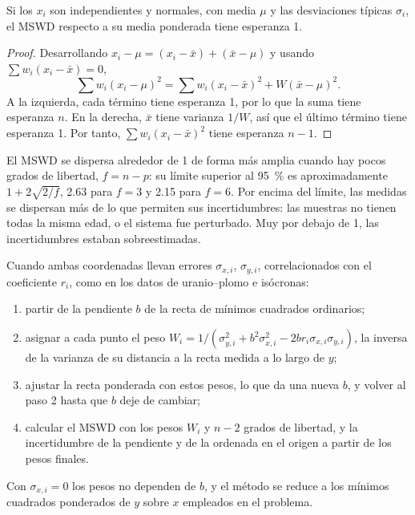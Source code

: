 \begin{proposition}\label{prop:b3:advanced-geochronology:mswd}
Si los $x_i$ son independientes y normales, con media $\mu$ y las desviaciones
típicas $\sigma_i$, el MSWD respecto a su media ponderada tiene esperanza 1.
\end{proposition}

\begin{proof}
Desarrollando $x_i - \mu = (x_i - \bar x) + (\bar x - \mu)$ y usando $\sum
w_i(x_i - \bar x) = 0$,
\[
\sum w_i(x_i - \mu)^2 = \sum w_i(x_i - \bar x)^2 + W(\bar x - \mu)^2.
\]
A la izquierda, cada término tiene esperanza 1, por lo que la suma tiene esperanza $n$. En
la derecha, $\bar x$ tiene varianza $1/W$, así que el último término tiene esperanza 1.
Por tanto, $\sum w_i(x_i - \bar x)^2$ tiene esperanza $n - 1$.
\end{proof}

El MSWD se dispersa alrededor de 1 de forma más amplia cuando hay pocos grados de libertad,
$f = n - p$: su límite superior al \qty{95}{\percent} es aproximadamente $1 +
2\sqrt{2/f}$, 2.63 para $f = 3$ y 2.15 para $f = 6$. Por encima del límite, las
medidas se dispersan más de lo que permiten sus incertidumbres: las muestras no tienen
todas la misma edad, o el sistema fue perturbado. Muy por debajo de 1, las
incertidumbres estaban sobreestimadas.

\begin{method}\label{met:b3:advanced-geochronology:york}
Cuando ambas coordenadas llevan errores $\sigma_{x,i}$, $\sigma_{y,i}$, correlacionados
con el coeficiente $r_i$, como en los datos de uranio--plomo e isócronas:
\begin{enumerate}
\item partir de la pendiente $b$ de la recta de mínimos cuadrados ordinarios;
\item asignar a cada punto el peso $W_i = 1/(\sigma_{y,i}^2 + b^2\sigma_{x,i}^2 -
2br_i\sigma_{x,i}\sigma_{y,i})$, la inversa de la varianza de su distancia a la
recta medida a lo largo de $y$;
\item ajustar la recta ponderada con estos pesos, lo que da una nueva $b$, y
volver al paso 2 hasta que $b$ deje de cambiar;
\item calcular el MSWD con los pesos $W_i$ y $n - 2$ grados de libertad,
y la incertidumbre de la pendiente y de la ordenada en el origen a partir de los pesos finales.
\end{enumerate}
Con $\sigma_{x,i} = 0$ los pesos no dependen de $b$, y el método
se reduce a los mínimos cuadrados ponderados de $y$ sobre $x$ empleados en el problema.
\end{method}

